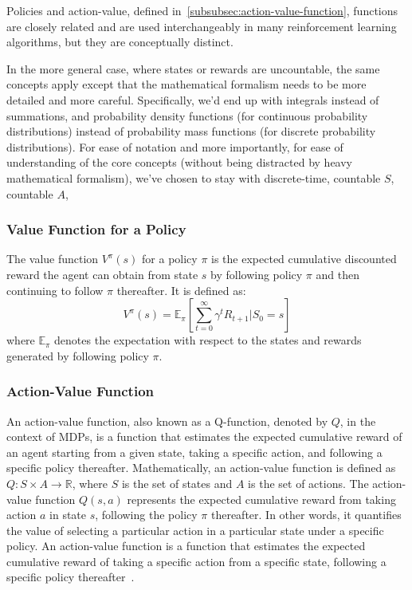 \documentclass[../xlapes02]{subfiles}
\begin{document}
    Policies and action-value, defined in~\cref{subsubsec:action-value-function}, functions are closely related and are used interchangeably in many reinforcement learning algorithms, but they are conceptually distinct.


    In the more general case, where states or rewards are uncountable, the same concepts apply except that the mathematical formalism needs to be more detailed and more careful. Specifically, we'd end up with integrals instead of summations, and probability density functions (for continuous probability distributions) instead of probability mass functions (for discrete probability distributions). For ease of notation and more importantly, for ease of understanding of the core concepts (without being distracted by heavy mathematical formalism), we've chosen to stay with discrete-time, countable $S$, countable $A$,

    \subsubsection{Value Function for a Policy}
    The value function $V^{\pi}(s)$ for a policy $\pi$ is the expected cumulative discounted reward the agent can obtain from state $s$ by following policy $\pi$ and then continuing to follow $\pi$ thereafter. It is defined as:
    \[
        V^{\pi}(s) = \mathbb{E}_{\pi}\left[\sum_{t=0}^{\infty} \gamma^t R_{t+1} | S_0 = s\right]
    \]
    where $\mathbb{E}_{\pi}$ denotes the expectation with respect to the states and rewards generated by following policy $\pi$.

    \subsubsection{Action-Value Function}
    An action-value function, also known as a Q-function, denoted by $Q$, in the context of MDPs, is a function that estimates the expected cumulative reward of an agent starting from a given state, taking a specific action, and following a specific policy thereafter.
    Mathematically, an action-value function is defined as $Q: S \times A \rightarrow \mathbb{R}$, where $S$ is the set of states and $A$ is the set of actions.
    The action-value function $Q(s,a)$ represents the expected cumulative reward from taking action $a$ in state $s$, following the policy $\pi$ thereafter.
    In other words, it quantifies the value of selecting a particular action in a particular state under a specific policy.
    An action-value function is a function that estimates the expected cumulative reward of taking a specific action from a specific state, following a specific policy thereafter~\cite{GPT3.5}.
\end{document}
